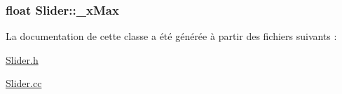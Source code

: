 \label{classSlider_a78852b38126a5e396b380d774b325de5}
\hypertarget{classSlider_ab86797eb102b82c5f3974b4d3df03707}{
\subsubsection[{\_\-xMax}]{\setlength{\rightskip}{0pt plus 5cm}float {\bf Slider::\_\-xMax}}}
\label{classSlider_ab86797eb102b82c5f3974b4d3df03707}


La documentation de cette classe a été générée à partir des fichiers suivants :\begin{DoxyCompactItemize}
\item 
\hyperlink{Slider_8h}{Slider.h}\item 
\hyperlink{Slider_8cc}{Slider.cc}\end{DoxyCompactItemize}
